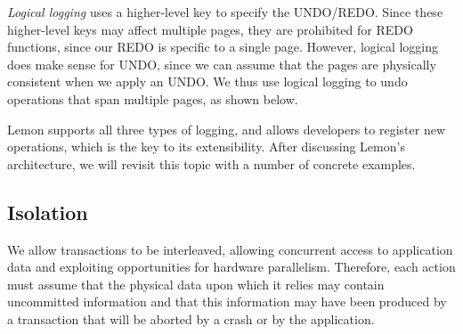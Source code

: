 \documentclass[letterpaper,twocolumn,english]{article}
\newcommand{\yad}{Lemon\xspace}
\begin{document}
{\em Logical logging} uses a higher-level key to specify the
UNDO/REDO.  Since these higher-level keys may affect multiple pages,
they are prohibited for REDO functions, since our REDO is specific to
a single page.  However, logical logging does make sense for UNDO,
since we can assume that the pages are physically consistent when we
apply an UNDO.  We thus use logical logging to undo operations that
span multiple pages, as shown below.


\yad supports all three types of logging, and allows developers to
register new operations, which is the key to its extensibility. After
discussing \yad's architecture, we will revisit this topic with a number of
concrete examples.



\subsection{Isolation}
\label{Isolation}

We allow transactions to be interleaved, allowing concurrent access to
application data and exploiting opportunities for hardware
parallelism.  Therefore, each action must assume that the
physical data upon which it relies may contain uncommitted
information and that this information may have been produced by a
transaction that will be aborted by a crash or by the application.

\end{document}
